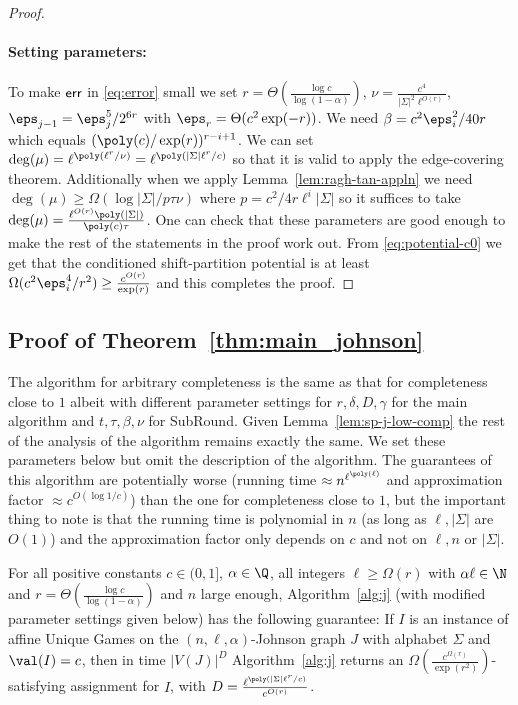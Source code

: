\begin{proof}
\paragraph{Setting parameters:} To make $\sf{err}$ in \eqref{eq:error} small we set $r = \Theta(\frac{\log c}{\log(1-\alpha)})$, $\nu = \frac{c^4}{|\Sigma|^2\ell^{O(r)}}$, $\eps_{j-1} = \eps_j^5/2^{6r}$ with $\eps_r = \Theta(c^2\exp(-r))$. We need $\beta = c^2\eps_i^2/40r$ which equals $(\poly(c)/\exp(r))^{r-i+1}$. We can set $\deg(\mu) = \ell^{\poly(\ell^r/\nu)} = \ell^{\poly(|\Sigma|\ell^r/c)}$ so that it is valid to apply the edge-covering theorem. Additionally when we apply Lemma~\ref{lem:ragh-tan-appln} we need $\deg(\mu) \geq \Omega(\log |\Sigma|/p\tau\nu)$ where $p = c^2/4r\ell^i|\Sigma|$ so it suffices to take $\deg(\mu) = \frac{\ell^{O(r)}\poly(|\Sigma|)}{\poly(c)\tau}$. One can check that these parameters are good enough to make the rest of the statements in the proof work out. From \eqref{eq:potential-c0} we get that the conditioned shift-partition potential is at least $\Omega(c^2\eps_i^4/r^2) \geq \frac{c^{O(r)}}{\exp(r)}$ and this completes the proof.
\end{proof}


\subsection{Proof of Theorem~\ref{thm:main_johnson}}
The algorithm for arbitrary completeness is the same as that for completeness close to $1$ albeit with different parameter settings for $r, \delta,D,\gamma$ for the main algorithm and $t,\tau,\beta,\nu$ for SubRound. Given Lemma~\ref{lem:sp-j-low-comp} the rest of the analysis of the algorithm remains exactly the same. We set these parameters below but omit the description of the algorithm. The guarantees of this algorithm are potentially worse (running time $\approx n^{\ell^{\poly(\ell)}}$ and approximation factor $\approx c^{O(\log 1/c)}$) than the one for completeness close to $1$, but the important thing to note is that the running time is polynomial in $n$ (as long as $\ell, |\Sigma|$ are $O(1)$) and the approximation factor only depends on $c$ and not on $\ell,n$ or $|\Sigma|$.

\begin{theorem}\label{thm:main-johnson-arbit-comp}
For all positive constants $c \in (0,1]$, $\alpha \in \Q$, all integers $\ell \geq \Omega(r)$ with $\alpha \ell \in \N$ and $r =  \Theta(\frac{\log c}{\log(1-\alpha)})$ and $n$ large enough, Algorithm~\ref{alg:j} (with modified parameter settings given below) has the following guarantee: If $I$ is an instance of affine Unique Games on the $(n,\ell,\alpha)$-Johnson graph $J$ with alphabet $\Sigma$ and $\val(I) = c$, then in time $|V(J)|^{D}$ Algorithm~\ref{alg:j} returns an $\Omega\left(\frac{c^{\Omega(r)}}{\exp(r^2)}\right)$-satisfying assignment for $I$, with $D = \frac{\ell^{\poly(|\Sigma|\ell^r/c)}}{c^{O(r)}}$.
\end{theorem}



